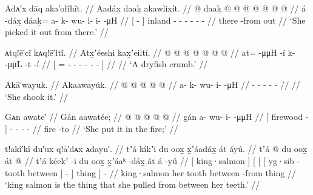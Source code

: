\ex\label{ex:92-76-picked-it-out}%
%
\begingl
	\glpreamble	Adᴀ′x dāq aka′ołîhît. //
	\glpreamble	Aadáx̱ daaḵ akawlixít. //
	\gla	{}  @ {} {}
		daaḵ @  @ {} @ {} @ {} @ {} @ {} @ {} //
	\glb	{} á -dáx̱ {}
		dáaḵ= a- k- wu- l- i-  -μH //
	\glc	{}[  - {}]
		inland - - - - -
			 - //
	\gld	{} there -from {} out  {} {} {} {} {} {} //
	\glft	‘She picked it out from there.’
		//
\endgl
\xe

\ex\label{ex:92-77-dryfish-crumbs}%
%
\begingl
	\glpreamble	ᴀtq!ē′cî kᴀq!ē′łtî. //
	\glpreamble	Atx̱ʼéeshi kax̱ʼeiltí. //
	\gla	{}  @ {} @ {} @ {}
		 @ {} @ {} @ {} @ {} {} //
	\glb	{} at=  -μμH -í
		k-  -μμL -t -í {} //
	\glc	{}[ =  - -
		-  - - - {}] //
	\gld	{}  {} {} {}
		 {} {} {} {} //
	\glft	‘A dryfish crumb.’
		//
\endgl
\xe

\ex\label{ex:92-78-she-shook-it}%
%
\begingl
	\glpreamble	Akā′wayuk. //
	\glpreamble	Akaawayúk. //
	\gla	{} @ {} @ {} @ {} @ {} @ {} //
	\glb	a- k- wu- i-  -μH //
	\glc	{}- - - -  - //
	\gld	{} {} {} {} {} {} //
	\glft	‘She shook it.’
		//
\endgl
\xe

\ex\label{ex:92-79-put-it-in-fire}%
%
\begingl
	\glpreamble	Gᴀn awate′ //
	\glpreamble	Gán aawatée; //
	\gla	{}  @ {} {}
		 @ {} @ {} @ {} @ {} //
	\glb	{} gán {} {}
		a- wu- i-  -μμH //
	\glc	{}[ firewood - {}]
		- - -  - //
	\gld	{} fire -to {}
		 {} {} {} {} //
	\glft	‘She put it in the fire;’
		//
\endgl
\xe

\ex\label{ex:92-80-king-salmon-thing-from-her-tooth}%
%
\begingl
	\glpreamble	t!akî′kî du′ux q!ā′dᴀx ᴀdayu′. //
	\glpreamble	tʼá kíkʼi du oox̱ x̱ʼáadáx̱ át áyú. //
	\gla	{} tʼá {}
		{} {} {}  @ {} du oox̱
			 {} {} {} át {}  @ {} //
	\glb	{} tʼá {}
		{} {} {} kéekʼ -i du oox̱
			x̱ʼáaᵏ {} -dáx̱ {} át {} á -yú //
	\glc	{}[ king·salmon {}]
		{}[ {}[ {}[ yg·sib -  tooth 
			between {}] - {}] thing {}]  - //
	\gld	{} king·salmon {}
		{} {} {}  {} her tooth
			between {} -from {} thing {}  {} //
	\glft	‘king salmon is the thing that she pulled from between her teeth.’
		//
\endgl
\xe


